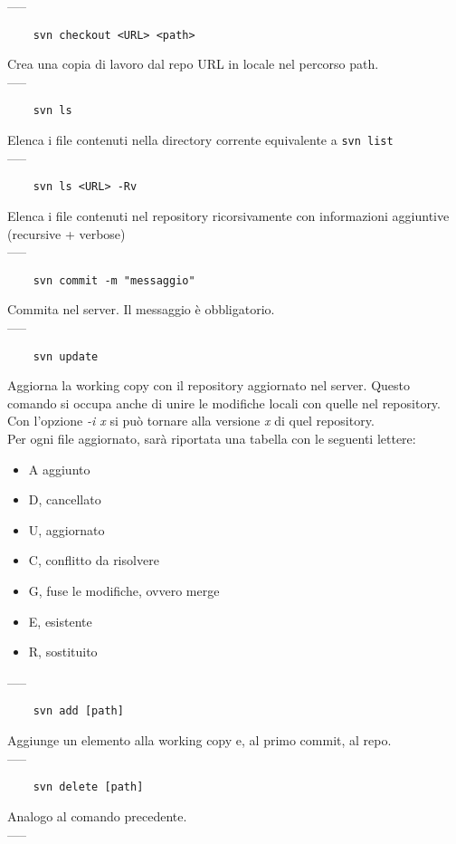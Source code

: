 \documentclass[a4paper]{article}
\begin{document}
	-----
	\begin{verbatim}
	svn checkout <URL> <path> 
	\end{verbatim}
	Crea una copia di lavoro dal repo URL in locale nel percorso path.\\-----
	\begin{verbatim}
	svn ls
	\end{verbatim}
	Elenca i file contenuti nella directory corrente equivalente a \verb|svn list|\\-----
	\begin{verbatim}
	svn ls <URL> -Rv
	\end{verbatim}
	Elenca i file contenuti nel repository ricorsivamente con informazioni aggiuntive (recursive + verbose)\\-----
	\begin{verbatim}
	svn commit -m "messaggio"
	\end{verbatim}
	Commita nel server. Il messaggio è obbligatorio.\\-----
	\begin{verbatim}
	svn update
	\end{verbatim}
	Aggiorna la working copy con il repository aggiornato nel server. Questo comando si occupa anche di unire le modifiche locali con quelle nel repository.\\
	Con l'opzione \textit{-i x} si può tornare alla versione \textit{x} di quel repository.\\
	Per ogni file aggiornato, sarà riportata una tabella con le seguenti lettere:
	\begin{itemize}
		\item A aggiunto
		\item D, cancellato
		\item U, aggiornato
		\item C, conflitto da risolvere
		\item G, fuse le modifiche, ovvero merge
		\item E, esistente
		\item R, sostituito
	\end{itemize}
	-----
	\begin{verbatim}
	svn add [path]
	\end{verbatim}
	Aggiunge un elemento alla working copy e, al primo commit, al repo.\\-----
	\begin{verbatim}
	svn delete [path]
	\end{verbatim}
	Analogo al comando precedente.\\-----
\end{document}
